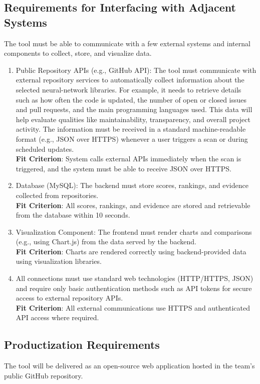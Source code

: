 \documentclass[12pt]{article}
\begin{document}
\subsection{Requirements for Interfacing with Adjacent Systems}
The tool must be able to communicate with a few external systems and internal components to collect, store, and visualize data.
\begin{enumerate}[label=OE-IA\arabic*]
  \item Public Repository APIs (e.g., GitHub API): The tool must communicate with external repository services to automatically collect information about the selected neural-network libraries. For example, it needs to retrieve details such as how often the code is updated, the number of open or closed issues and pull requests, and the main programming languages used. This data will help evaluate qualities like maintainability, transparency, and overall project activity. The information must be received in a standard machine-readable format (e.g., JSON over HTTPS) whenever a user triggers a scan or during scheduled updates.
  \\ \textbf{Fit Criterion}: System calls external APIs immediately when the scan is triggered, and the system must be able to receive JSON over HTTPS.
  \item Database (MySQL): The backend must store scores, rankings, and evidence collected from repositories.
\\ \textbf{Fit Criterion}: All scores, rankings, and evidence are stored and retrievable from the database within 10 seconds.
  \item Visualization Component: The frontend must render charts and comparisons (e.g., using Chart.js) from the data served by the backend.
\\ \textbf{Fit Criterion}: Charts are rendered correctly using backend-provided data using visualization libraries.
  \item All connections must use standard web technologies (HTTP/HTTPS, JSON) and require only basic authentication methods such as API tokens for secure access to external repository APIs.
\\ \textbf{Fit Criterion}: All external communications use HTTPS and authenticated API access where required.
\end{enumerate}

\subsection{Productization Requirements}
The tool will be delivered as an open-source web application hosted in the team’s public GitHub repository.
\end{document}
